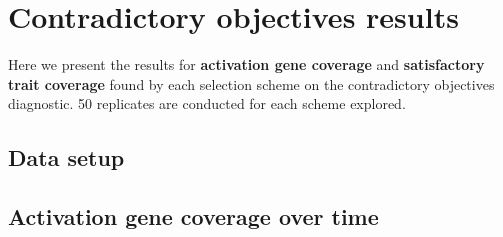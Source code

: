 \documentclass[]{book}
\newenvironment{Shaded}{\begin{snugshade}}{\end{snugshade}}
\newcommand{\DataTypeTok}[1]{\textcolor[rgb]{0.13,0.29,0.53}{#1}}
\newcommand{\KeywordTok}[1]{\textcolor[rgb]{0.13,0.29,0.53}{\textbf{#1}}}
\newcommand{\NormalTok}[1]{#1}
\newcommand{\OperatorTok}[1]{\textcolor[rgb]{0.81,0.36,0.00}{\textbf{#1}}}
\newcommand{\OtherTok}[1]{\textcolor[rgb]{0.56,0.35,0.01}{#1}}
\newcommand{\StringTok}[1]{\textcolor[rgb]{0.31,0.60,0.02}{#1}}
\begin{document}
\hypertarget{contradictory-objectives-results}{%
\chapter{Contradictory objectives results}\label{contradictory-objectives-results}}

Here we present the results for \textbf{activation gene coverage} and \textbf{satisfactory trait coverage} found by each selection scheme on the contradictory objectives diagnostic.
50 replicates are conducted for each scheme explored.

\hypertarget{data-setup-2}{%
\section{Data setup}\label{data-setup-2}}

\begin{Shaded}
\end{Shaded}

\hypertarget{activation-gene-coverage-over-time}{%
\section{Activation gene coverage over time}\label{activation-gene-coverage-over-time}}
\end{document}
